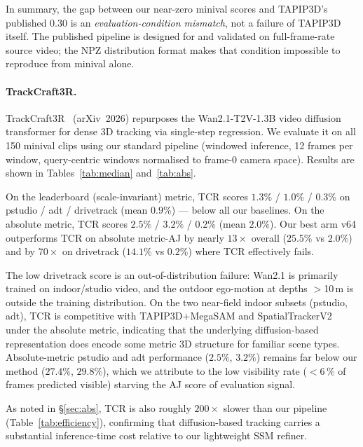 \documentclass[11pt,a4paper]{article}
\begin{document}
In summary, the gap between our near-zero minival scores and TAPIP3D's published 0.30 is an
\emph{evaluation-condition mismatch}, not a failure of TAPIP3D itself.
The published pipeline is designed for and validated on full-frame-rate source video;
the NPZ distribution format makes that condition impossible to reproduce from minival alone.

\paragraph{TrackCraft3R.}
\label{sec:trackcraft3r}
TrackCraft3R~\cite{trackcraft3r} (arXiv~2026) repurposes the Wan2.1-T2V-1.3B video diffusion
transformer for dense 3D tracking via single-step regression.
We evaluate it on all 150 minival clips using our standard pipeline (windowed inference,
12 frames per window, query-centric windows normalised to frame-0 camera space).
Results are shown in Tables~\ref{tab:median} and~\ref{tab:abs}.

On the leaderboard (scale-invariant) metric, TCR scores $1.3\%$ / $1.0\%$ / $0.3\%$
on pstudio / adt / drivetrack (mean $0.9\%$) --- below all our baselines.
On the absolute metric, TCR scores $2.5\%$ / $3.2\%$ / $0.2\%$ (mean $2.0\%$).
Our best arm v64 outperforms TCR on absolute metric-AJ by nearly $13\times$ overall
($25.5\%$ vs $2.0\%$) and by $70\times$ on drivetrack ($14.1\%$ vs $0.2\%$) where TCR
effectively fails.

The low drivetrack score is an out-of-distribution failure: Wan2.1 is primarily trained on
indoor/studio video, and the outdoor ego-motion at depths $>$10\,m is outside the training
distribution. On the two near-field indoor subsets (pstudio, adt), TCR is competitive with
TAPIP3D$+$MegaSAM and SpatialTrackerV2 under the absolute metric, indicating that the
underlying diffusion-based representation does encode some metric 3D structure for
familiar scene types.
Absolute-metric pstudio and adt performance ($2.5\%$, $3.2\%$) remains far below our
method ($27.4\%$, $29.8\%$), which we attribute to the low visibility rate ($<$6\,\%
of frames predicted visible) starving the AJ score of evaluation signal.

As noted in \S\ref{sec:abs}, TCR is also roughly $200\times$ slower than our pipeline
(Table~\ref{tab:efficiency}), confirming that diffusion-based tracking carries a
substantial inference-time cost relative to our lightweight SSM refiner.
\end{document}
